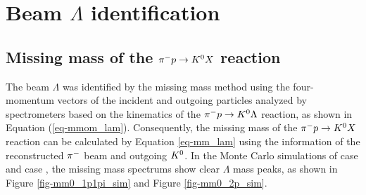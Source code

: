 \begin{comment}
\subsubsection{Path length of $\Kz$ projected onto the $z-$axis}
\label{sec-dzk0}
In the $\Kz$ event, ideally, the difference between the vertex position of the $\pM$ beam and $\Kz$ tracks, and the vertex position of the two outgoing $\pi$s' tracks should become larger depending on the path length of $\Kz$. In contrast, it must be zero in the non-strangeness multiple $\pi$ events. In other words, this vertex position difference corresponds to the $\Kz$ path length inside the LH$_2$ target. The $\Kz$ path length projected onto the $z-$axis, $\Delta z_{\Kz}$, can be calculated as 
\begin{align}
  \Delta z_{\Kz} &= z_{decay} - z_{prod}, \\
  		        &= z_{\pP,\ \pM} - z_{\pM\ beam,\ \Kz},
  \label{eq-dzk0}
\end{align}
where $z_{\pP,\ \pM}$ ($z_{decay}$) is the vertex position of the outgoing $\pM$ and $\pP$ tracks projected onto the $z-$axis, and $z_{\pM\ beam,\ \Kz}$ ($z_{prod}$) is the vertex position of the $\pM$ beam and reconstructed $\Kz$ tracks projected onto the $z-$axis. The Monte Carlo simulation indicates that it would distribute in the $-50 - 200$ mm range as shown in Figure \ref{fig-K0path_sim}, so the cut was chosen at the same region for E40 data as shown in Figure \ref{fig-K0path}. 
\end{comment}


\clearpage
\section{Beam $\Lambda$ identification}
\label{sec-beamLID}
\subsection{Missing mass of the $\pi^- p \to K^0 X$ reaction}
The beam $\Lambda$ was identified by the missing mass method using the four-momentum vectors of the incident and outgoing particles analyzed by spectrometers based on the kinematics of the $\pi^- p \to K^0 \Lambda$ reaction, as shown in Equation (\ref{eq-mmom_lam}). Consequently, the missing mass of the $\pi^- p \to K^0 X$ reaction can be calculated by Equation \ref{eq-mm_lam} using the information of the reconstructed $\pi^{-}$ beam and outgoing $K^{0}$. In the Monte Carlo simulations of case  and case , the missing mass spectrums show clear $\Lambda$ mass peaks, as shown in Figure \ref{fig-mm0_1p1pi_sim} and Figure \ref{fig-mm0_2p_sim}.

